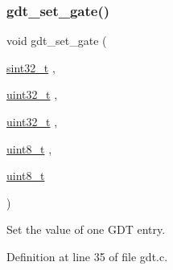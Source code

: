 \subsubsection{\texorpdfstring{gdt\+\_\+set\+\_\+gate()}{gdt\_set\_gate()}}
{\footnotesize\ttfamily void gdt\+\_\+set\+\_\+gate (\begin{DoxyParamCaption}\item[{\hyperlink{a00101_ad838970452fe561cb8e0550cac5336be_ad838970452fe561cb8e0550cac5336be}{sint32\+\_\+t}}]{,  }\item[{\hyperlink{a00101_a435d1572bf3f880d55459d9805097f62_a435d1572bf3f880d55459d9805097f62}{uint32\+\_\+t}}]{,  }\item[{\hyperlink{a00101_a435d1572bf3f880d55459d9805097f62_a435d1572bf3f880d55459d9805097f62}{uint32\+\_\+t}}]{,  }\item[{\hyperlink{a00101_aba7bc1797add20fe3efdf37ced1182c5_aba7bc1797add20fe3efdf37ced1182c5}{uint8\+\_\+t}}]{,  }\item[{\hyperlink{a00101_aba7bc1797add20fe3efdf37ced1182c5_aba7bc1797add20fe3efdf37ced1182c5}{uint8\+\_\+t}}]{ }\end{DoxyParamCaption})}



Set the value of one G\+DT entry. 



Definition at line 35 of file gdt.\+c.


